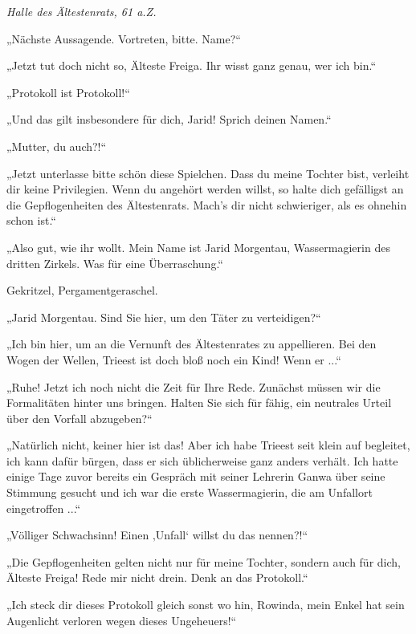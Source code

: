 
\textit{Halle des Ältestenrats, 61 a.Z.}\bigskip



„Nächste Aussagende. Vortreten, bitte. Name?“

„Jetzt tut doch nicht so, Älteste Freiga. Ihr wisst ganz genau, wer ich bin.“

„Protokoll ist Protokoll!“

„Und das gilt insbesondere für dich, Jarid! Sprich deinen Namen.“

„Mutter, du auch?!“

„Jetzt unterlasse bitte schön diese Spielchen. Dass du meine Tochter bist, verleiht dir keine Privilegien. Wenn du angehört werden willst, so halte dich gefälligst an die Gepflogenheiten des Ältestenrats. Mach’s dir nicht schwieriger, als es ohnehin schon ist.“

„Also gut, wie ihr wollt. Mein Name ist Jarid Morgentau, Wassermagierin des dritten Zirkels. Was für eine Überraschung.“

Gekritzel, Pergamentgeraschel.

„Jarid Morgentau. Sind Sie hier, um den Täter zu verteidigen?“

„Ich bin hier, um an die Vernunft des Ältestenrates zu appellieren. Bei den Wogen der Wellen, Trieest ist doch bloß noch ein Kind! Wenn er ...“

„Ruhe! Jetzt ich noch nicht die Zeit für Ihre Rede. Zunächst müssen wir die Formalitäten hinter uns bringen. Halten Sie sich für fähig, ein neutrales Urteil über den Vorfall abzugeben?“

„Natürlich nicht, keiner hier ist das! Aber ich habe Trieest seit klein auf begleitet, ich kann dafür bürgen, dass er sich üblicherweise ganz anders verhält. Ich hatte einige Tage zuvor bereits ein Gespräch mit seiner Lehrerin Ganwa über seine Stimmung gesucht und ich war die erste Wassermagierin, die am Unfallort eingetroffen ...“

„Völliger Schwachsinn! Einen ‚Unfall‘ willst du das nennen?!“

„Die Gepflogenheiten gelten nicht nur für meine Tochter, sondern auch für dich, Älteste Freiga! Rede mir nicht drein. Denk an das Protokoll.“

„Ich steck dir dieses Protokoll gleich sonst wo hin, Rowinda, mein Enkel hat sein Augenlicht verloren wegen dieses Ungeheuers!“







